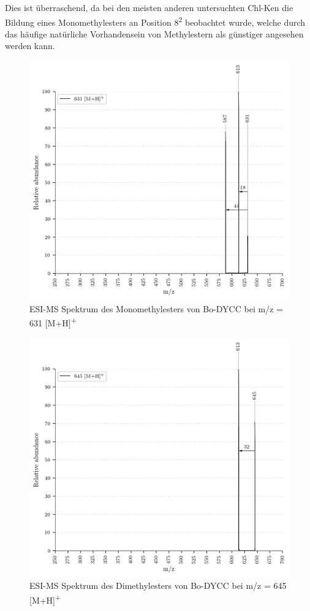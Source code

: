 Dies ist überraschend, da bei den meisten anderen untersuchten \gls{Chl-K}en die Bildung eines Monomethylesters an Position 8\textsuperscript{2} beobachtet wurde, welche durch das häufige natürliche Vorhandensein von Methylestern als günstiger angesehen werden kann.

\begin{figure}[!htbp]
  \centering
  \includegraphics[width=\textwidth, height=0.7\textwidth]{figures/Kapitel7/Kataboliten/VWA_MS_631.png}
  \caption[ESI-MS Spektrum des Monomethylesters von Bo-DYCC, Quelle: Author]{ESI-MS Spektrum des Monomethylesters von Bo-DYCC bei m/z = 631 [M+H]\textsuperscript{+}}
  \label{fig:631MH}
\end{figure}

\begin{figure}[!htbp]
  \centering
  \includegraphics[width=\textwidth, height=0.6\textwidth]{figures/Kapitel7/Kataboliten/VWA_MS_645-2.png}
  \caption[ESI-MS Spektrum des Diethylesters von Bo-DYCC, Quelle: Author]{ESI-MS Spektrum des Dimethylesters von Bo-DYCC bei m/z = 645 [M+H]\textsuperscript{+}}
  \label{fig:645MH}
\end{figure}


